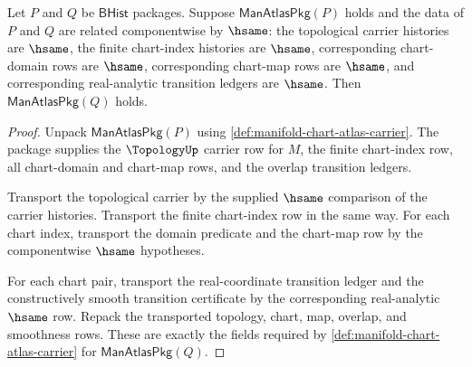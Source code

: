\begin{theorem}
\label{thm:manifold-chart-transition-classifier-stability}
Let $P$ and $Q$ be $\mathsf{BHist}$ packages. Suppose
$\mathsf{ManAtlasPkg}(P)$ holds and the data of $P$ and $Q$ are related
componentwise by $\hsame$: the topological carrier histories are $\hsame$, the
finite chart-index histories are $\hsame$, corresponding chart-domain rows are
$\hsame$, corresponding chart-map rows are $\hsame$, and corresponding
real-analytic transition ledgers are $\hsame$. Then
$\mathsf{ManAtlasPkg}(Q)$ holds.
\end{theorem}
\begin{proof}
Unpack $\mathsf{ManAtlasPkg}(P)$ using
\autoref{def:manifold-chart-atlas-carrier}. The package supplies the
$\TopologyUp$ carrier row for $M$, the finite chart-index row, all chart-domain
and chart-map rows, and the overlap transition ledgers.

Transport the topological carrier by the supplied $\hsame$ comparison of the
carrier histories. Transport the finite chart-index row in the same way. For
each chart index, transport the domain predicate and the chart-map row by the
componentwise $\hsame$ hypotheses.

For each chart pair, transport the real-coordinate transition ledger and the
constructively smooth transition certificate by the corresponding
real-analytic $\hsame$ row. Repack the transported topology, chart, map,
overlap, and smoothness rows. These are exactly the fields required by
\autoref{def:manifold-chart-atlas-carrier} for
$\mathsf{ManAtlasPkg}(Q)$.
\end{proof}

